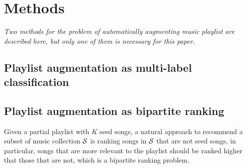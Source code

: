 \section{Methods}
{\it Two methods for the problem of automatically augmenting music playlist are described here, but only one of them is necessary for this paper.}


\subsection{Playlist augmentation as multi-label classification}


%


%


\subsection{Playlist augmentation as bipartite ranking}

Given a partial playlist with $K$ seed songs, a natural approach to recommend a subset of music collection $\mathcal{S}$ is 
ranking songs in $\mathcal{S}$ that are not seed songs, in particular, songs that are more relevant to the playlist should be
ranked higher that those that are not, which is a bipartite ranking problem.


